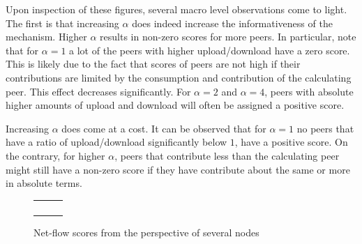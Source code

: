 \documentclass[a4paper,11pt]{book}
\theoremstyle{definition}
\begin{document}
Upon inspection of these figures, several macro level observations come to light. The first
is that increasing $\alpha$ does indeed increase the informativeness of the mechanism.
Higher $\alpha$ results in non-zero scores for more peers. In particular, note that
for $\alpha=1$ a lot of the peers with higher upload/download have a zero score. This is
likely due to the fact that scores of peers are not high if their contributions are limited
by the consumption and contribution of the calculating peer. This effect decreases
significantly. For $\alpha=2$ and $\alpha=4$, peers with absolute higher amounts of upload
and download will often be assigned a positive score. 

Increasing $\alpha$ does come at a cost. It can be observed that for $\alpha=1$ no peers
that have a ratio of upload/download significantly below $1$, have a positive score. 
On the contrary, for higher $\alpha$, peers that contribute less than the calculating
peer might still have a non-zero score if they have contribute about the same or more
in absolute terms.

\begin{figure}[ht]
    \begin{tabular}[ht]{ccc}
         &
         &
         \\

         &
         &
         \\

         &
         &
         \\
        
         &
         &
         \\
    \end{tabular}
    \caption{Net-flow scores from the perspective of several nodes}
    \label{fig:nf_alpha_comparison}
\end{figure}
\end{document}
